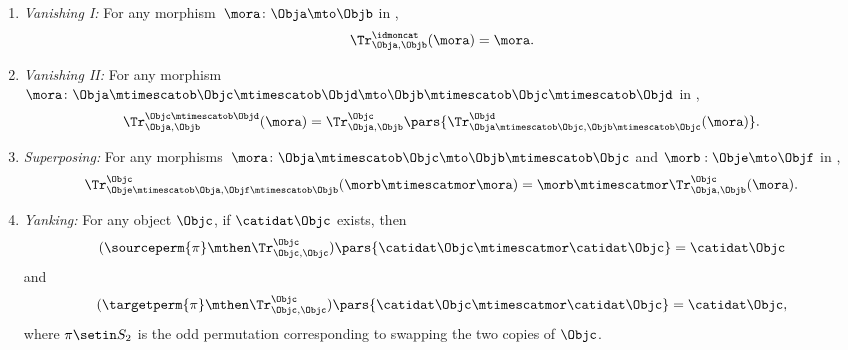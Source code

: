 \begin{widepar}
\begin{ctdefinition}
\begin{enumerate}
            \item \emph{Vanishing I:}
                  For any morphism~$\mora \colon \Obja\mto \Objb$ in \CatC,
                  \begin{equation}
                      \label{eq:semicat-trace-vanishing_1}
                      \Tr_{\Obja,\Objb}^\idmoncat (\mora)=\mora.
                  \end{equation}

            \item \emph{Vanishing II:}
                  For any morphism~$\mora \colon \Obja\mtimescatob \Objc \mtimescatob \Objd \mto \Objb\mtimescatob \Objc \mtimescatob \Objd$ in \CatC,
                  \begin{equation}
                      \label{eq:semicat-trace-vanishing_2}
                      \Tr_{\Obja,\Objb}^{\Objc\mtimescatob \Objd}(\mora)=\Tr_{\Obja,\Objb}^\Objc\pars{
                          \Tr_{\Obja \mtimescatob \Objc, \Objb \mtimescatob \Objc}^\Objd(\mora)}.
                  \end{equation}

            \item \emph{Superposing:}
                  For any morphisms~$\mora\colon \Obja\mtimescatob \Objc \mto \Objb\mtimescatob \Objc$ and $\morb : \Obje \mto \Objf$ in \CatC,
                  \begin{equation}
                      \label{eq:semicat-trace-superposing}
                      \Tr_{\Obje\mtimescatob \Obja,\Objf\mtimescatob \Objb}^{\Objc}(\morb \mtimescatmor \mora)=\morb \mtimescatmor \Tr_{\Obja,\Objb}^\Objc(\mora).
                  \end{equation}

            \item \emph{Yanking:}
                  For any object $\Objc$, if $\catidat\Objc$ exists, then
                  \begin{equation}
                      \label{eq:semicat-trace-yanking-I}
                      (\sourceperm{\pi}   \mthen \Tr_{\Objc,\Objc}^\Objc)\pars{\catidat\Objc \mtimescatmor \catidat\Objc }=\catidat\Objc
                  \end{equation}
                  and
                  \begin{equation}
                      \label{eq:semicat-trace-yanking-II}
                      (\targetperm{\pi}  \mthen \Tr_{\Objc,\Objc}^\Objc)\pars{\catidat\Objc \mtimescatmor \catidat\Objc }=\catidat\Objc,
                  \end{equation}
                  where $\pi \setin S_2$ is the odd permutation corresponding to swapping the two copies of $\Objc$.
        \end{enumerate}
    \end{ctdefinition}
\end{widepar}

